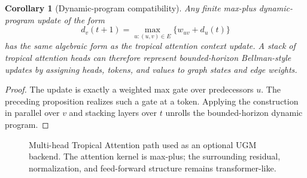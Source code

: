 \documentclass[11pt]{article}
\newtheorem{corollary}[definition]{Corollary}
\newcommand{\1}{\mathbf{1}}
\begin{document}
\begin{corollary}[Dynamic-program compatibility]
Any finite max-plus dynamic-program update of the form
\[
  d_v(t+1)=\max_{u:(u,v)\in E}\{w_{uv}+d_u(t)\}
\]
has the same algebraic form as the tropical attention context update. A stack of tropical attention heads can therefore represent bounded-horizon Bellman-style updates by assigning heads, tokens, and values to graph states and edge weights.
\end{corollary}

\begin{proof}
The update is exactly a weighted max gate over predecessors \(u\). The preceding proposition realizes such a gate at a token. Applying the construction in parallel over \(v\) and stacking layers over \(t\) unrolls the bounded-horizon dynamic program.
\end{proof}

\begin{figure}[H]
\centering
{}
\caption{Multi-head Tropical Attention path used as an optional UGM backend. The attention kernel is max-plus; the surrounding residual, normalization, and feed-forward structure remains transformer-like.}
\label{fig:mhta_backend}
\end{figure}
\end{document}
